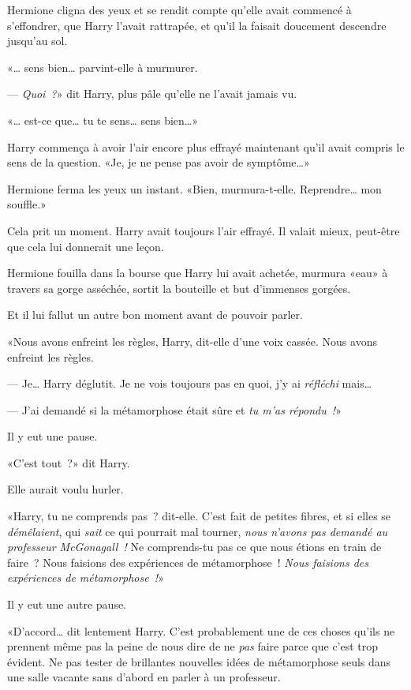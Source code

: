 Hermione cligna des yeux et se rendit compte qu'elle avait commencé à s'effondrer, que Harry l'avait rattrapée, et qu'il la faisait doucement descendre jusqu'au sol.

«… sens bien… parvint-elle à murmurer.

--- \emph{Quoi~?}» dit Harry, plus pâle qu'elle ne l'avait jamais vu.

«… est-ce que… tu te sens… sens bien…»

Harry commença à avoir l'air encore plus effrayé maintenant qu'il avait compris le sens de la question. «Je, je ne pense pas avoir de symptôme…»

Hermione ferma les yeux un instant. «Bien, murmura-t-elle. Reprendre… mon souffle.»

Cela prit un moment. Harry avait toujours l'air effrayé. Il valait mieux, peut-être que cela lui donnerait une leçon.

Hermione fouilla dans la bourse que Harry lui avait achetée, murmura «eau» à travers sa gorge asséchée, sortit la bouteille et but d'immenses gorgées.

Et il lui fallut un autre bon moment avant de pouvoir parler.

«Nous avons enfreint les règles, Harry, dit-elle d'une voix cassée. Nous avons enfreint les règles.

--- Je… Harry déglutit. Je ne vois toujours pas en quoi, j'y ai \emph{réfléchi} mais…

--- J'ai demandé si la métamorphose était sûre et \emph{tu m'as répondu~!}»

Il y eut une pause.

«C'est tout~?» dit Harry.

Elle aurait voulu hurler.

«Harry, tu ne comprends pas~? dit-elle. C'est fait de petites fibres, et si elles se \emph{démêlaient}, qui \emph{sait} ce qui pourrait mal tourner, \emph{nous n'avons pas demandé au professeur McGonagall~!} Ne comprends-tu pas ce que nous étions en train de faire~? Nous faisions des expériences de métamorphose~! \emph{Nous faisions des expériences de métamorphose~!}»

Il y eut une autre pause.

«D'accord… dit lentement Harry. C'est probablement une de ces choses qu'ils ne prennent même pas la peine de nous dire de ne \emph{pas} faire parce que c'est trop évident. Ne pas tester de brillantes nouvelles idées de métamorphose seuls dans une salle vacante sans d'abord en parler à un professeur.

